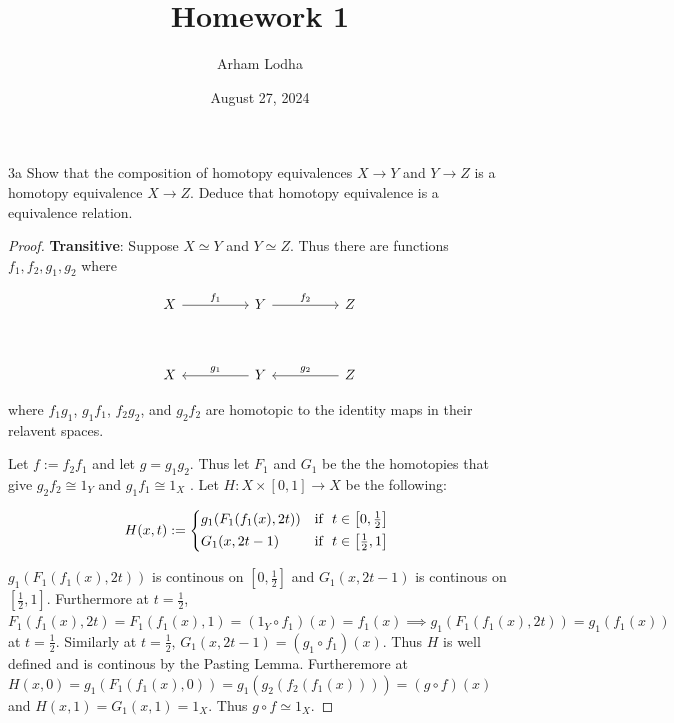 \documentclass{article}
\begin{document}
\title{Homework 1}
\author{Arham Lodha}%
\date{August 27, 2024}%
\maketitle


\begin{claim}{3a}\label{Claim 3a.}
    Show that the composition of homotopy equivalences $X \to Y$ and $Y \to Z$ is a homotopy equivalence $X \to Z$. Deduce that homotopy equivalence is a equivalence relation.   
\end{claim}
\begin{proof}
    \textbf{Transitive}: Suppose $X \simeq Y$ and $Y \simeq Z$. Thus there are functions $f_1, f_2, g_1, g_2$ where 
    
    \[\begin{tikzcd}
        X && Y && Z \\
        \\
        X && Y && Z
        \arrow["{f_1}", from=1-1, to=1-3]
        \arrow["{f_2}", from=1-3, to=1-5]
        \arrow["{g_1}"', from=3-3, to=3-1]
        \arrow["{g_2}"', from=3-5, to=3-3]
    \end{tikzcd}\]

    where $f_1g_1$, $g_1f_1$, $f_2g_2$, and $g_2f_2$ are homotopic to the identity maps in their relavent spaces. 
    
    Let $f := f_2 f_1$ and let $g = g_1 g_2$. Thus let $F_1$ and $G_1$ be the the homotopies that give $g_2 f_2 \cong 1_{Y}$ and $g_1 f_1 \cong 1_X$ . Let $H: X \times [0, 1] \to X$ be the following:
    
    \begin{equation*}
        H(x, t) := \begin{cases*}
            g_1(F_1(f_1(x), 2t)) & \text{if } $t \in \left[0, \frac{1}{2}\right] $\\
            G_1(x, 2t - 1) & \text{if } $t \in \left[\frac{1}{2}, 1\right] $
        \end{cases*}
    \end{equation*}
    
    $g_1(F_1(f_1(x), 2t))$ is continous on $[0, \frac{1}{2}]$ and $G_1(x, 2t - 1)$ is continous on $[\frac{1}{2}, 1]$. Furthermore at $t = \frac{1}{2}$, $F_1(f_1(x), 2t) = F_1(f_1(x), 1) = (1_Y \circ f_1)(x) = f_1(x) \implies  g_1(F_1(f_1(x), 2t)) = g_1(f_1(x))$ at $t = \frac{1}{2}$. Similarly at $t = \frac{1}{2}$, $G_1(x, 2t - 1) = (g_1 \circ f_1)(x)$. Thus $H$ is well defined and is continous by the Pasting Lemma. Furtheremore at $H(x, 0) = g_1(F_1(f_1(x), 0)) = g_1(g_2(f_2(f_1(x)))) = (g \circ f)(x)$ and $H(x, 1) = G_1(x, 1) = 1_X$. Thus $g \circ f \simeq 1_X$. 
    

\end{proof}
\end{document}
